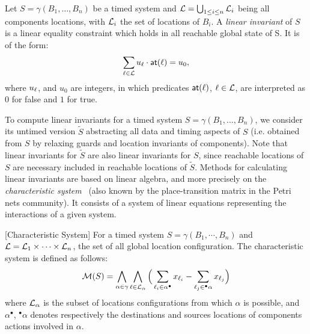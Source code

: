 \begin{definition}
\label{def:inv}
Let $S = \gamma(B_1,\dotsc,B_n)$ be a timed system and $\mathcal{L} = \bigcup_{1 \leq i \leq n} \mathcal{L}_i$
being all components locations, with $\mathcal{L}_i$ the set of locations of $B_i$.
A \emph{linear invariant} of $S$ is a linear equality constraint 
which holds in all reachable global state of S. It is of the form:
$$ \sum_{\ell \in\mathcal{L}}u_{\ell}\cdot \textsf{at}(\ell) = u_0, $$
where $u_{\ell}$, and $u_0$ are integers, in which predicates $\textsf{at}(\ell)$,
$\ell \in \mathcal{L}$, are interpreted as $0$ for false and $1$ for true.
\end{definition}

To compute linear invariants for a timed system $S = \gamma(B_1,\dotsc,B_n)$, we consider its 
untimed version $\tilde{S}$ abstracting all data and timing aspects of $S$
(i.e. obtained from $S$ by relaxing guards and location invariants of components).
Note that linear invariants for $\tilde{S}$ are also linear invariants for $S$, since 
reachable locations of $S$ are necessary included in reachable locations of $\tilde{S}$.
Methods for calculating linear invariants are based on linear algebra, and more precisely
on the \emph{characteristic system}~\cite{inv1} (also known by the place-transition matrix in 
the Petri nets community). It consists of a system of linear equations representing 
the interactions of a given system.
\begin{definition}\label{def:chars}[Characteristic System]
  For a timed system $S=\gamma(B_1,\cdots,B_n)$ and $\mathcal{L}=\mathcal{L}_1\times\cdots\times\mathcal{L}_n$,
  the set of all global location configuration. The characteristic system is defined as 
  follows:
  $$\mathcal{M}(S)=\bigwedge_{\alpha\in\gamma}\bigwedge_{\ell\in\mathcal{L}_{\alpha}}
\Big(\sum_{\ell_i\in\alpha^{\bullet}}x_{\ell_i}-\sum_{\ell_j\in{^\bullet}\alpha}x_{\ell_j}\Big)$$
  where $\mathcal{L}_{\alpha}$ is the subset of locations configurations from which $\alpha$ is 
  possible, and $\alpha^{\bullet}$, ${^\bullet}\alpha$ denotes respectively the destinations and 
  sources locations of components actions involved in $\alpha$.
\end{definition}

